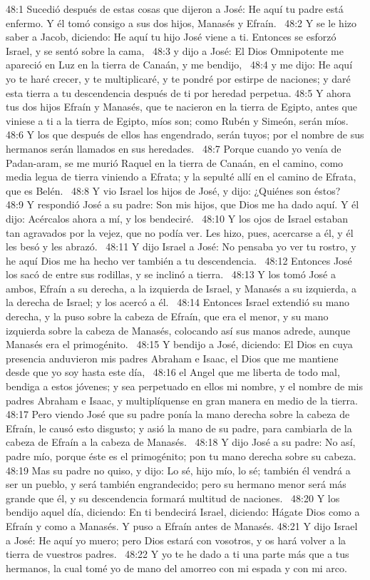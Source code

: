 48:1 Sucedió después de estas cosas que dijeron a José: He aquí tu padre está enfermo. Y él tomó consigo a sus dos hijos, Manasés y Efraín.  
48:2 Y se le hizo saber a Jacob, diciendo: He aquí tu hijo José viene a ti. Entonces se esforzó Israel, y se sentó sobre la cama,  
48:3 y dijo a José: El Dios Omnipotente me apareció en Luz en la tierra de Canaán, y me bendijo,  
48:4 y me dijo: He aquí yo te haré crecer, y te multiplicaré, y te pondré por estirpe de naciones; y daré esta tierra a tu descendencia después de ti por heredad perpetua. 
48:5 Y ahora tus dos hijos Efraín y Manasés, que te nacieron en la tierra de Egipto, antes que viniese a ti a la tierra de Egipto, míos son; como Rubén y Simeón, serán míos.  
48:6 Y los que después de ellos has engendrado, serán tuyos; por el nombre de sus hermanos serán llamados en sus heredades.  
48:7 Porque cuando yo venía de Padan-aram, se me murió Raquel en la tierra de Canaán, en el camino, como media legua de tierra viniendo a Efrata; y la sepulté allí en el camino de Efrata, que es Belén.  
48:8 Y vio Israel los hijos de José, y dijo: ¿Quiénes son éstos?  
48:9 Y respondió José a su padre: Son mis hijos, que Dios me ha dado aquí. Y él dijo: Acércalos ahora a mí, y los bendeciré.  
48:10 Y los ojos de Israel estaban tan agravados por la vejez, que no podía ver. Les hizo, pues, acercarse a él, y él les besó y les abrazó.  
48:11 Y dijo Israel a José: No pensaba yo ver tu rostro, y he aquí Dios me ha hecho ver también a tu descendencia.  
48:12 Entonces José los sacó de entre sus rodillas, y se inclinó a tierra.  
48:13 Y los tomó José a ambos, Efraín a su derecha, a la izquierda de Israel, y Manasés a su izquierda, a la derecha de Israel; y los acercó a él.  
48:14 Entonces Israel extendió su mano derecha, y la puso sobre la cabeza de Efraín, que era el menor, y su mano izquierda sobre la cabeza de Manasés, colocando así sus manos adrede, aunque Manasés era el primogénito.  
48:15 Y bendijo a José, diciendo: El Dios en cuya presencia anduvieron mis padres Abraham e Isaac, el Dios que me mantiene desde que yo soy hasta este día,  
48:16 el Angel que me liberta de todo mal, bendiga a estos jóvenes; y sea perpetuado en ellos mi nombre, y el nombre de mis padres Abraham e Isaac, y multiplíquense en gran manera en medio de la tierra.  
48:17 Pero viendo José que su padre ponía la mano derecha sobre la cabeza de Efraín, le causó esto disgusto; y asió la mano de su padre, para cambiarla de la cabeza de Efraín a la cabeza de Manasés.  
48:18 Y dijo José a su padre: No así, padre mío, porque éste es el primogénito; pon tu mano derecha sobre su cabeza.  
48:19 Mas su padre no quiso, y dijo: Lo sé, hijo mío, lo sé; también él vendrá a ser un pueblo, y será también engrandecido; pero su hermano menor será más grande que él, y su descendencia formará multitud de naciones.  
48:20 Y los bendijo aquel día, diciendo: En ti bendecirá Israel, diciendo: Hágate Dios como a Efraín y como a Manasés. Y puso a Efraín antes de Manasés. 
48:21 Y dijo Israel a José: He aquí yo muero; pero Dios estará con vosotros, y os hará volver a la tierra de vuestros padres.  
48:22 Y yo te he dado a ti una parte más que a tus hermanos, la cual tomé yo de mano del amorreo con mi espada y con mi arco.  
